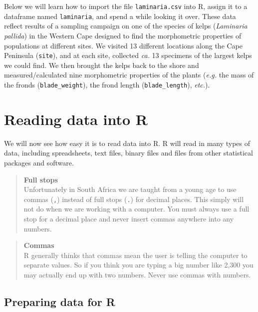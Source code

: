\documentclass[]{book}
\theoremstyle{definition}
\theoremstyle{definition}
\theoremstyle{definition}
\theoremstyle{remark}
\begin{document}
Below we will learn how to import the file \texttt{laminaria.csv} into
R, assign it to a dataframe named \texttt{laminaria}, and spend a while
looking it over. These data reflect results of a sampling campaign on
one of the species of kelps (\emph{Laminaria pallida}) in the Western
Cape designed to find the morphometric properties of populations at
different sites. We visited 13 different locations along the Cape
Peninsula (\texttt{site}), and at each site, collected \emph{ca.} 13
specimens of the largest kelps we could find. We then brought the kelps
back to the shore and measured/calculated nine morphometric properties
of the plants (\emph{e.g.} the mass of the fronds
(\texttt{blade\_weight}), the frond length (\texttt{blade\_length}),
\emph{etc.}).

\section{Reading data into R}\label{reading-data-into-r}

We will now see how easy it is to read data into R. R will read in many
types of data, including spreadsheets, text files, binary files and
files from other statistical packages and software.

\begin{quote}
\textbf{Full stops}\\
Unfortunately in South Africa we are taught from a young age to use
commas (\texttt{,}) instead of full stops (\texttt{.}) for decimal
places. This simply will not do when we are working with a computer. You
must always use a full stop for a decimal place and never insert commas
anywhere into any numbers.
\end{quote}

\begin{quote}
\textbf{Commas}\\
R generally thinks that commas mean the user is telling the computer to
separate values. So if you think you are typing a big number like 2,300
you may actually end up with two numbers. Never use commas with numbers.
\end{quote}

\subsection{Preparing data for R}\label{preparing-data-for-r}
\end{document}
